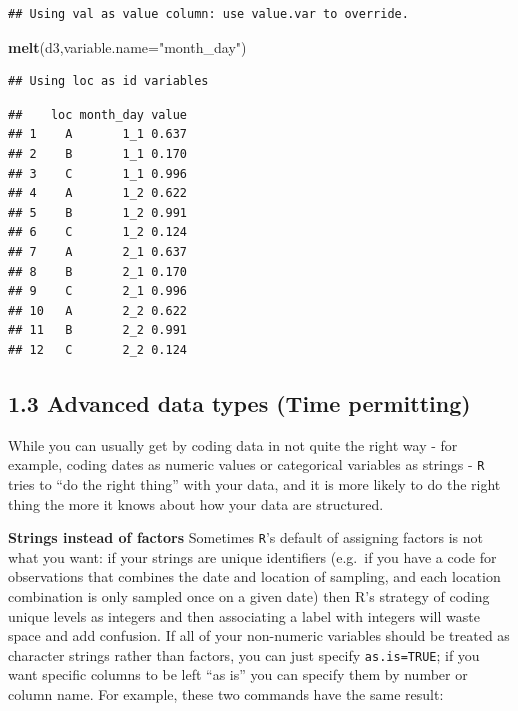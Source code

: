 \documentclass[11pt,]{article}
\newenvironment{Shaded}{\begin{snugshade}}{\end{snugshade}}
\newcommand{\KeywordTok}[1]{\textcolor[rgb]{0.13,0.29,0.53}{\textbf{#1}}}
\newcommand{\DataTypeTok}[1]{\textcolor[rgb]{0.13,0.29,0.53}{#1}}
\newcommand{\StringTok}[1]{\textcolor[rgb]{0.31,0.60,0.02}{#1}}
\newcommand{\NormalTok}[1]{#1}
\begin{document}
\begin{verbatim}
## Using val as value column: use value.var to override.
\end{verbatim}

\begin{Shaded}
\begin{Highlighting}[]
\KeywordTok{melt}\NormalTok{(d3,}\DataTypeTok{variable.name=}\StringTok{"month_day"}\NormalTok{)}
\end{Highlighting}
\end{Shaded}

\begin{verbatim}
## Using loc as id variables
\end{verbatim}

\begin{verbatim}
##    loc month_day value
## 1    A       1_1 0.637
## 2    B       1_1 0.170
## 3    C       1_1 0.996
## 4    A       1_2 0.622
## 5    B       1_2 0.991
## 6    C       1_2 0.124
## 7    A       2_1 0.637
## 8    B       2_1 0.170
## 9    C       2_1 0.996
## 10   A       2_2 0.622
## 11   B       2_2 0.991
## 12   C       2_2 0.124
\end{verbatim}

\subsection{1.3 Advanced data types (Time
permitting)}\label{advanced-data-types-time-permitting}

While you can usually get by coding data in not quite the right way -
for example, coding dates as numeric values or categorical variables as
strings - \texttt{R} tries to ``do the right thing'' with your data, and
it is more likely to do the right thing the more it knows about how your
data are structured.

\textbf{Strings instead of factors} Sometimes \texttt{R}'s default of
assigning factors is not what you want: if your strings are unique
identifiers (e.g.~if you have a code for observations that combines the
date and location of sampling, and each location combination is only
sampled once on a given date) then R's strategy of coding unique levels
as integers and then associating a label with integers will waste space
and add confusion. If all of your non-numeric variables should be
treated as character strings rather than factors, you can just specify
\texttt{as.is=TRUE}; if you want specific columns to be left ``as is''
you can specify them by number or column name. For example, these two
commands have the same result:
\end{document}
